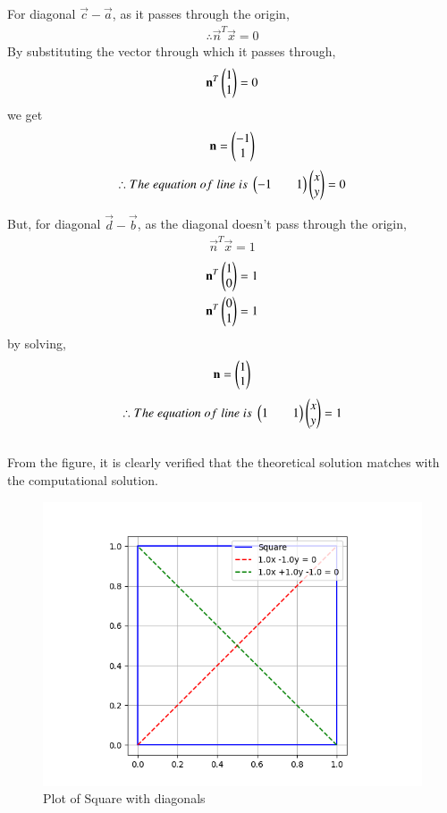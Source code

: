 \documentclass[journal]{IEEEtran}
\begin{document}
For diagonal $\vec{c}-\vec{a}$, as it passes through the origin,
\begin{align*}
    \therefore \vec{n}^T\vec{x}=0
\end{align*}
By substituting the vector through which it passes through,
\begin{align*}
    \mathbf{n}^T\begin{pmatrix}1\\1\end{pmatrix}=0
\end{align*}
we get
\begin{align*}
    \mathbf{n}=\begin{pmatrix}-1\\1\end{pmatrix}
\end{align*}
\begin{align*}
    \therefore The\;equation\;of\;line\;is\;\begin{pmatrix}-1&&1\end{pmatrix}\begin{pmatrix}x\\y\end{pmatrix}=0
\end{align*}
\newpage
\vspace*{0.25cm}

But, for diagonal $\vec{d}-\vec{b}$, as the diagonal doesn't pass through the origin,
\begin{align*}
    \vec{n}^T\vec{x}=1
\end{align*}
\begin{align*}
    \mathbf{n}^T\begin{pmatrix}1\\0\end{pmatrix}=1\\
    \mathbf{n}^T\begin{pmatrix}0\\1\end{pmatrix}=1
\end{align*} 
by solving,
\begin{align*}
    \mathbf{n}=\begin{pmatrix}1\\1\end{pmatrix}
\end{align*}
\begin{align*}
    \therefore The\;equation\;of\;line\;is\;\begin{pmatrix}1&&1\end{pmatrix}\begin{pmatrix}x\\y\end{pmatrix}=1
\end{align*}
\\
From the figure, it is clearly verified that the theoretical solution matches with the computational solution.\\
\begin{figure}[H]
    \centering
    \includegraphics[width=0.6\columnwidth]{figs/Figure_1.png}
    \caption*{Plot of Square with diagonals}
    \label{fig:1}
\end{figure}
\end{document}
